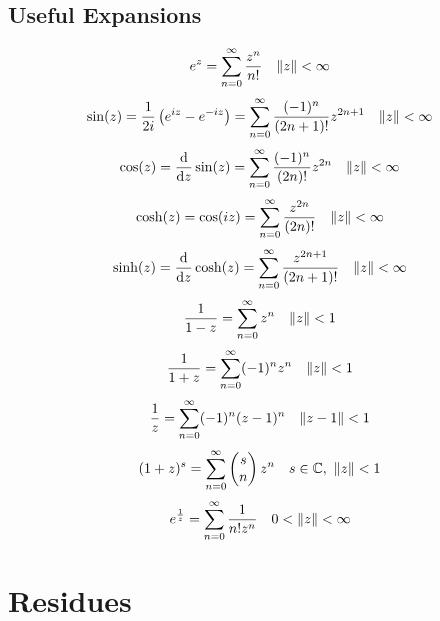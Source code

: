 \documentclass[../complete.tex]{subfiles}
\begin{document}
\subsection{Useful Expansions}
\begin{equation}
	e^z=\sum_{n=0}^\infty\frac{z^n}{n!}\quad\norm{z}<\infty
	\label{eq:expser}
\end{equation}
\begin{equation}
	\sin(z)=\frac{1}{2i}\left( e^{iz}-e^{-iz} \right)=\sum_{n=0}^{\infty}\frac{(-1)^n}{(2n+1)!}z^{2n+1}\quad\norm{z}<\infty
	\label{eq:sinser}
\end{equation}
\begin{equation}
	\cos(z)=\derivative{z}\sin(z)=\sum_{n=0}^{\infty}\frac{(-1)^n}{(2n)!}z^{2n}\quad\norm{z}<\infty
	\label{eq:cosser}
\end{equation}
\begin{equation}
	\cosh(z)=\cos(iz)=\sum_{n=0}^{\infty}\frac{z^{2n}}{(2n)!}\quad\norm{z}<\infty
	\label{eq:coshser}
\end{equation}
\begin{equation}
	\sinh(z)=\derivative{z}\cosh(z)=\sum_{n=0}^{\infty}\frac{z^{2n+1}}{(2n+1)!}\quad\norm{z}<\infty
	\label{eq:sinhser}
\end{equation}
\begin{equation}
	\frac{1}{1-z}=\sum_{n=0}^{\infty}z^n\quad\norm{z}<1
	\label{eq:geomser}
\end{equation}
\begin{equation}
	\frac{1}{1+z}=\sum_{n=0}^{\infty}(-1)^nz^n\quad\norm{z}<1
	\label{eq:geomminoneser}
\end{equation}
\begin{equation}
	\frac{1}{z}=\sum_{n=0}^{\infty}(-1)^n(z-1)^n\quad\norm{z-1}<1
	\label{eq:zminoneser}
\end{equation}
\begin{equation}
	(1+z)^s=\sum_{n=0}^{\infty}\begin{pmatrix}s\\n\end{pmatrix}z^n\quad s\in\mathbb{C},\ \norm{z}<1
	\label{eq:binomser}
\end{equation}
\begin{equation}
	e^{\frac{1}{z}}=\sum_{n=0}^{\infty}\frac{1}{n!z^n}\quad0<\norm{z}<\infty
	\label{eq:explaur}
\end{equation}
\section{Residues}
\end{document}
